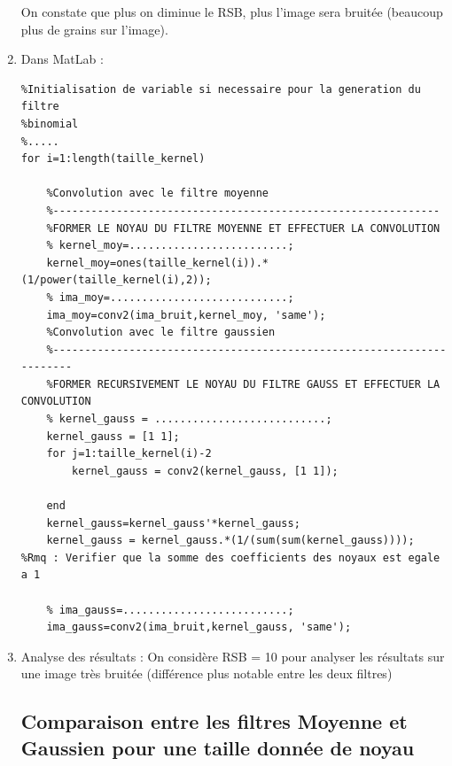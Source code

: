 \documentclass{article}
\begin{document}
\begin{enumerate}[label=\arabic*$\degres$)]
On constate que plus on diminue le RSB, plus l'image sera bruitée (beaucoup plus de grains sur l'image).

	\item Dans MatLab :
\begin{lstlisting}
%Initialisation de variable si necessaire pour la generation du filtre
%binomial
%.....
for i=1:length(taille_kernel)
    
    %Convolution avec le filtre moyenne
    %-------------------------------------------------------------
    %FORMER LE NOYAU DU FILTRE MOYENNE ET EFFECTUER LA CONVOLUTION
    % kernel_moy=.........................;
    kernel_moy=ones(taille_kernel(i)).*(1/power(taille_kernel(i),2));
    % ima_moy=............................;
    ima_moy=conv2(ima_bruit,kernel_moy, 'same');
    %Convolution avec le filtre gaussien
    %----------------------------------------------------------------------
    %FORMER RECURSIVEMENT LE NOYAU DU FILTRE GAUSS ET EFFECTUER LA CONVOLUTION
    % kernel_gauss = ...........................;
    kernel_gauss = [1 1];
    for j=1:taille_kernel(i)-2
        kernel_gauss = conv2(kernel_gauss, [1 1]);
        
    end
    kernel_gauss=kernel_gauss'*kernel_gauss;
    kernel_gauss = kernel_gauss.*(1/(sum(sum(kernel_gauss))));
%Rmq : Verifier que la somme des coefficients des noyaux est egale a 1

    % ima_gauss=..........................;
    ima_gauss=conv2(ima_bruit,kernel_gauss, 'same'); 
\end{lstlisting}
    
    	\item Analyse des résultats : On considère RSB = 10 pour analyser les résultats sur une image très bruitée (différence plus notable entre les deux filtres)


\subsection*{Comparaison entre les filtres Moyenne et Gaussien pour une taille donnée de noyau}



\end{enumerate}
\end{document}
